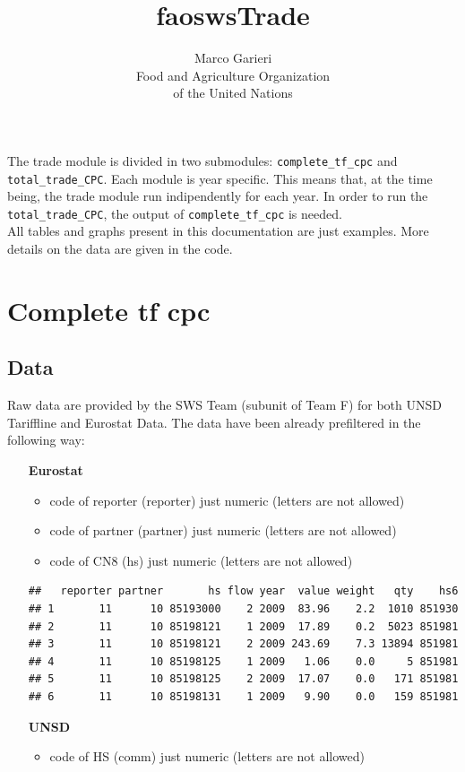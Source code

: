 \documentclass[nojss]{jss}\usepackage[]{graphicx}\usepackage[]{color}
\title{\bf faoswsTrade}
\author{Marco Garieri \\ Food and Agriculture Organization \\ of
  the United Nations}
\makeatletter
\newenvironment{kframe}{%
 \def\at@end@of@kframe{}%
 \ifinner\ifhmode%
  \def\at@end@of@kframe{\end{minipage}}%
  \begin{minipage}{\columnwidth}%
 \fi\fi%
 \def\FrameCommand##1{\hskip\@totalleftmargin \hskip-\fboxsep
 \colorbox{shadecolor}{##1}\hskip-\fboxsep
     \hskip-\linewidth \hskip-\@totalleftmargin \hskip\columnwidth}%
 \MakeFramed {\advance\hsize-\width
   \@totalleftmargin\z@ \linewidth\hsize
   \@setminipage}}%
 {\par\unskip\endMakeFramed%
 \at@end@of@kframe}
\newenvironment{knitrout}{}{} %
\makeatother
\begin{document}
\newpage


The trade module is divided in two submodules: {\tt complete\_tf\_cpc} and {\tt total\_trade\_CPC}. Each module is year specific. This means that, at the time being, the trade module run indipendently for each year. In order to run the {\tt total\_trade\_CPC}, the output of {\tt complete\_tf\_cpc} is needed.\\
All tables and graphs present in this documentation are just examples. More details on the data are given in the code.

\section{Complete tf cpc}

\subsection{Data}
Raw data are provided by the SWS Team (subunit of Team F) for both UNSD Tariffline and Eurostat Data. The data have been already prefiltered in the following way:
\begin{itemize}
\item [\bf{Eurostat}]
\begin{itemize}
\item code of reporter (reporter) just numeric (letters are not allowed)
\item code of partner (partner) just numeric (letters are not allowed)
\item code of CN8 (hs) just numeric (letters are not allowed)
\end{itemize}

\begin{knitrout}
\color{fgcolor}\begin{kframe}
\begin{verbatim}
##   reporter partner       hs flow year  value weight   qty    hs6
## 1       11      10 85193000    2 2009  83.96    2.2  1010 851930
## 2       11      10 85198121    1 2009  17.89    0.2  5023 851981
## 3       11      10 85198121    2 2009 243.69    7.3 13894 851981
## 4       11      10 85198125    1 2009   1.06    0.0     5 851981
## 5       11      10 85198125    2 2009  17.07    0.0   171 851981
## 6       11      10 85198131    1 2009   9.90    0.0   159 851981
\end{verbatim}
\end{kframe}
\end{knitrout}

\item [\bf{UNSD}]
\begin{itemize}
\item code of HS (comm) just numeric (letters are not allowed)
\end{itemize}
\end{itemize}
\end{document}
